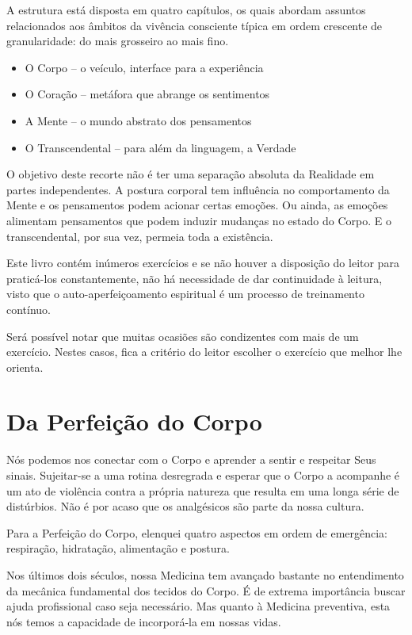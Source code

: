 \documentclass[oneside, 12pt]{book}
\begin{document}
A estrutura está disposta em quatro capítulos, os quais abordam assuntos relacionados aos âmbitos da vivência consciente típica em ordem crescente de granularidade: do mais grosseiro ao mais fino.

\begin{itemize}
\item O Corpo -- o veículo, interface para a experiência
\item O Coração -- metáfora que abrange os sentimentos
\item A Mente -- o mundo abstrato dos pensamentos
\item O Transcendental -- para além da linguagem, a Verdade
\end{itemize}

O objetivo deste recorte não é ter uma separação absoluta da Realidade em partes independentes. A postura corporal tem influência no comportamento da Mente e os pensamentos podem acionar certas emoções. Ou ainda, as emoções alimentam pensamentos que podem induzir mudanças no estado do Corpo. E o transcendental, por sua vez, permeia toda a existência.

Este livro contém inúmeros exercícios e se não houver a disposição do leitor para praticá-los constantemente, não há necessidade de dar continuidade à leitura, visto que o auto-aperfeiçoamento espiritual é um processo de treinamento contínuo.

Será possível notar que muitas ocasiões são condizentes com mais de um exercício. Nestes casos, fica a critério do leitor escolher o exercício que melhor lhe orienta.

\chapter*{Da Perfeição do Corpo}

Nós podemos nos conectar com o Corpo e aprender a sentir e respeitar Seus sinais. Sujeitar-se a uma rotina desregrada e esperar que o Corpo a acompanhe é um ato de violência contra a própria natureza que resulta em uma longa série de distúrbios. Não é por acaso que os analgésicos são parte da nossa cultura.

Para a Perfeição do Corpo, elenquei quatro aspectos em ordem de e\-mer\-gên\-cia: respiração, hidratação, alimentação e postura.

Nos últimos dois séculos, nossa Medicina tem avançado bastante no entendimento da mecânica fundamental dos tecidos do Corpo. É de extrema importância buscar ajuda profissional caso seja necessário. Mas quanto à Medicina preventiva, esta nós temos a capacidade de incorporá-la em nossas vidas.
\end{document}
